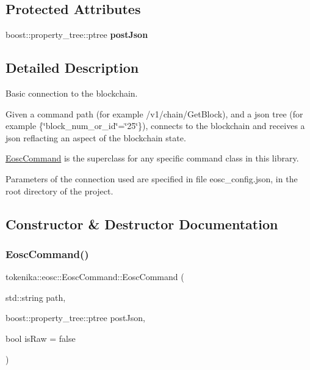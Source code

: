 \subsection*{Protected Attributes}
\begin{DoxyCompactItemize}
\item 
\mbox{\label{classtokenika_1_1eosc_1_1_eosc_command_a1642782c91f4877a8fba395324fb7337}} 
boost\+::property\+\_\+tree\+::ptree {\bfseries post\+Json}
\end{DoxyCompactItemize}


\subsection{Detailed Description}
Basic connection to the blockchain. 

Given a command path (for example {\ttfamily /v1/chain/\+Get\+Block}), and a json tree (for example \{\char`\"{}block\+\_\+num\+\_\+or\+\_\+id\char`\"{}=\char`\"{}25\char`\"{}\}), connects to the blockchain and receives a json reflacting an aspect of the blockchain state.

{\ttfamily \hyperlink{classtokenika_1_1eosc_1_1_eosc_command}{Eosc\+Command}} is the superclass for any specific command class in this library.

Parameters of the connection used are specified in file {\ttfamily eosc\+\_\+config.\+json}, in the root directory of the project. 

\subsection{Constructor \& Destructor Documentation}
\mbox{\label{classtokenika_1_1eosc_1_1_eosc_command_ab736f0dcd8ca14eb0daf9b2244218397}} 
\subsubsection{\texorpdfstring{Eosc\+Command()}{EoscCommand()}}
{\footnotesize\ttfamily tokenika\+::eosc\+::\+Eosc\+Command\+::\+Eosc\+Command (\begin{DoxyParamCaption}\item[{std\+::string}]{path,  }\item[{boost\+::property\+\_\+tree\+::ptree}]{post\+Json,  }\item[{bool}]{is\+Raw = {\ttfamily false} }\end{DoxyParamCaption})\hspace{0.3cm}{\ttfamily [inline]}}



